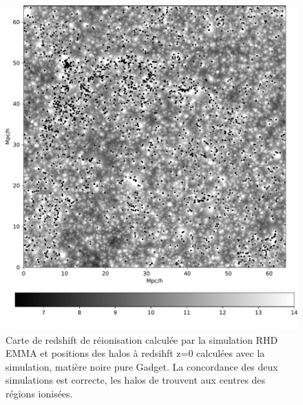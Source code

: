 \begin{figure}
		\centering
        \includegraphics[width=.95\linewidth]{img/05/maphaloh.pdf} 
        \caption[Carte de redshift et halos]{Carte de redshift de réionisation calculée par la simulation \ac{RHD} EMMA et positions des halos à redsihft z=0 calculées avec la simulation, matière noire pure Gadget.
        La concordance des deux simulations est correcte, les halos de trouvent aux centres des régions ionisées.
		\label{fig:zmapcomp}}
\end{figure}




